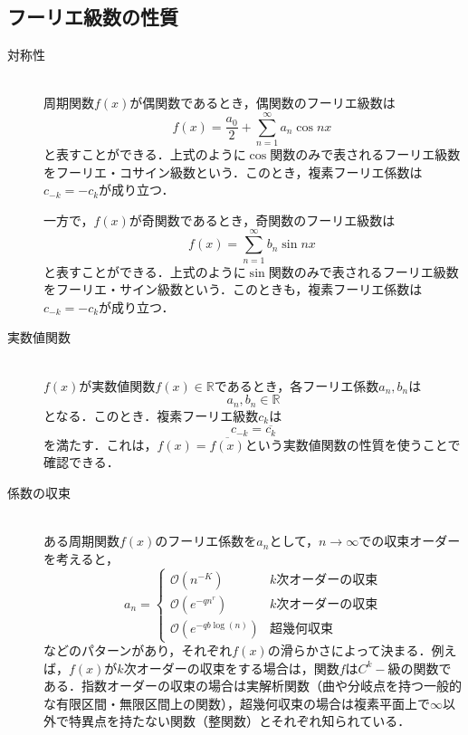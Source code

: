 \documentclass[11pt,a4paper,titlepage]{jsreport}
\theoremstyle{definition}
\begin{document}
\subsection{フーリエ級数の性質}
\begin{description}
  \item[対称性]
    \quad\\
    周期関数$f(x)$が偶関数であるとき，偶関数のフーリエ級数は
    \begin{equation*}
      f(x)=\frac{a_0}{2} + \sum_{n=1}^{\infty} a_n \cos nx \
    \end{equation*}
    と表すことができる．上式のように$\cos$関数のみで表されるフーリエ級数をフーリエ・コサイン級数という．このとき，複素フーリエ係数は$c_{-k}=-c_k$が成り立つ．

    一方で，$f(x)$が奇関数であるとき，奇関数のフーリエ級数は
    \begin{equation*}
      f(x) = \sum_{n=1}^{\infty} b_n \sin nx \
    \end{equation*}
    と表すことができる．上式のように$\sin$関数のみで表されるフーリエ級数をフーリエ・サイン級数という．このときも，複素フーリエ係数は$c_{-k}=-c_k$が成り立つ．

  \item[実数値関数]
    \quad\\
    $f(x)$が実数値関数$f(x)\in \mathbb{R}$であるとき，各フーリエ係数$a_n,b_n$は
    \begin{equation*}
      a_n,b_n\in\mathbb{R}
    \end{equation*}
    となる．このとき．複素フーリエ級数$c_k$は
    \begin{equation*}
      c_{-k}=\overline{c_k}
    \end{equation*}
    を満たす．これは，$f(x)=\overline{f(x)}$という実数値関数の性質を使うことで確認できる．

  \item[係数の収束]
    \quad\\
    ある周期関数$f(x)$のフーリエ係数を$a_n$として，$n\rightarrow \infty$での収束オーダーを考えると，
    \begin{equation*}
      a_n = \begin{cases}
        \mathcal{O}\left(n^{-K}\right)          & k次オーダーの収束 \\
        \mathcal{O}\left(e^{-qn^r}\right)       & k次オーダーの収束 \\
        \mathcal{O}\left(e^{-qb\log (n)}\right) & 超幾何収束
      \end{cases}
    \end{equation*}
    などのパターンがあり，それぞれ$f(x)$の滑らかさによって決まる．例えば，$f(x)$が$k$次オーダーの収束をする場合は，関数$f$は$C^k-級$の関数である．指数オーダーの収束の場合は実解析関数（曲や分岐点を持つ一般的な有限区間・無限区間上の関数），超幾何収束の場合は複素平面上で$\infty$以外で特異点を持たない関数（整関数）とそれぞれ知られている．


\end{description}
\end{document}
